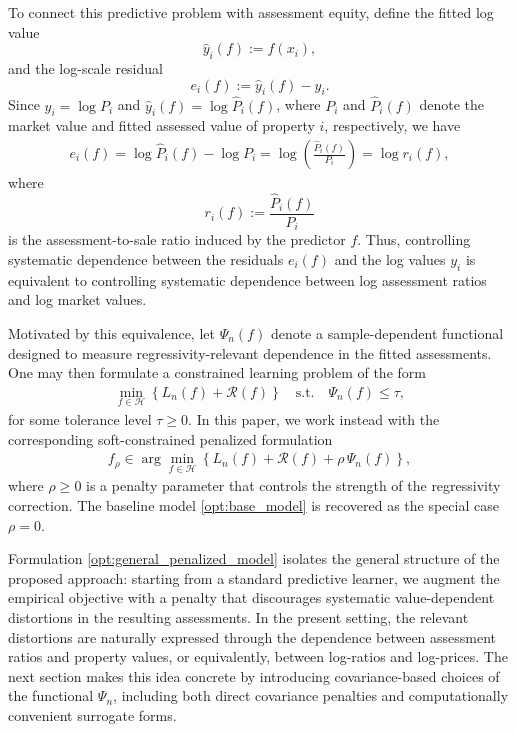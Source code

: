 \documentclass[12pt, draft]{article}
\theoremstyle{plain}
\theoremstyle{definition}
\newcommand{\1}{\mathbf{1}}
\renewcommand{\H}{\mathcal{H}}
\begin{document}
To connect this predictive problem with assessment equity, define the fitted log value
\[
\hat y_i(f) := f(x_i),
\]
and the log-scale residual
\[
e_i(f) := \hat y_i(f) - y_i.
\]
Since $y_i = \log P_i$ and $\hat y_i(f) = \log \hat P_i(f)$, where $P_i$ and $\hat P_i(f)$ denote the market value and fitted assessed value of property $i$, respectively, we have
\begin{align}
    e_i(f)
    = \log \hat P_i(f) - \log P_i
    = \log\!\left(\frac{\hat P_i(f)}{P_i}\right)
    = \log r_i(f),
\end{align}
where
\[
r_i(f) := \frac{\hat P_i(f)}{P_i}
\]
is the assessment-to-sale ratio induced by the predictor $f$. Thus, controlling systematic dependence between the residuals $e_i(f)$ and the log values $y_i$ is equivalent to controlling systematic dependence between log assessment ratios and log market values.

Motivated by this equivalence, let $\Psi_n(f)$ denote a sample-dependent functional designed to measure regressivity-relevant dependence in the fitted assessments. One may then formulate a constrained learning problem of the form
\begin{align}
    \label{opt:general_constrained_model}
    \min_{f \in \H}
    \left\{
        L_n(f) + \mathcal{R}(f)
    \right\}
    \quad
    \text{s.t.}
    \quad
    \Psi_n(f) \le \tau,
\end{align}
for some tolerance level $\tau \ge 0$. In this paper, we work instead with the corresponding soft-constrained penalized formulation
\begin{align}
    \label{opt:general_penalized_model}
    f_{\rho}
    \in
    \arg\min_{f \in \H}
    \left\{
        L_n(f) + \mathcal{R}(f) + \rho\,\Psi_n(f)
    \right\},
\end{align}
where $\rho \ge 0$ is a penalty parameter that controls the strength of the regressivity correction. The baseline model \eqref{opt:base_model} is recovered as the special case $\rho=0$.

Formulation \eqref{opt:general_penalized_model} isolates the general structure of the proposed approach: starting from a standard predictive learner, we augment the empirical objective with a penalty that discourages systematic value-dependent distortions in the resulting assessments. In the present setting, the relevant distortions are naturally expressed through the dependence between assessment ratios and property values, or equivalently, between log-ratios and log-prices. The next section makes this idea concrete by introducing covariance-based choices of the functional $\Psi_n$, including both direct covariance penalties and computationally convenient surrogate forms.
\end{document}
